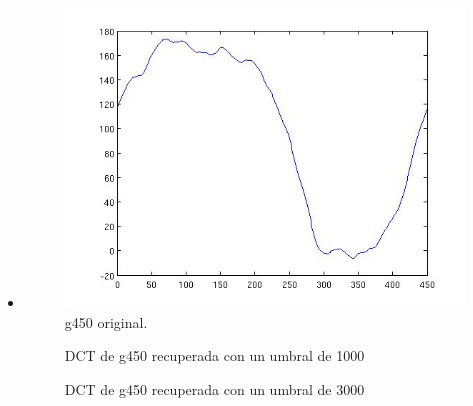 \documentclass[10pt, a4paper]{article}
\begin{document}
\begin{itemize}
\begin{itemize}
\item {}
\begin{figure}[H] %
\begin{center}
\includegraphics[width=300pt]{./g450.jpg}
\caption[h]{g450 original.}
\end{center}
\end{figure}

\begin{figure}[H] %
\hfill
\begin{minipage}[t]{.45\textwidth}
\begin{center}
\caption{DCT de g450 recuperada con un umbral de 1000}
\label{fig-tc1}
\end{center}
\end{minipage}
\hfill
\begin{minipage}[t]{.45\textwidth}
\begin{center}
\caption{DCT de g450 recuperada con un umbral de 3000}
\label{fig-tc2}
\end{center}
\end{minipage}
\hfill
\end{figure} 


\end{itemize}
\end{itemize}
\end{document}
